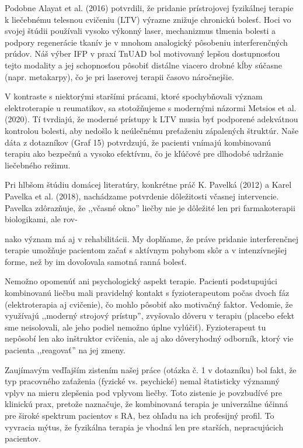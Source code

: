 Podobne Alayat et al. (2016) potvrdili, že pridanie prístrojovej fyzikálnej terapie k liečebnému telesnou cvičeniu (LTV) výrazne znižuje chronickú bolesť. Hoci vo svojej štúdii používali vysoko výkonný laser, mechanizmus tlmenia bolesti a podpory regenerácie tkanív je v mnohom analogický pôsobeniu interferenčných prúdov. Náš výber IFP v praxí TnUAD bol motivovaný lepšou dostupnosťou tejto modality a jej schopnosťou pôsobiť distálne viacero drobné kĺby súčasne (napr. metakarpy), čo je pri laserovej terapii časovo náročnejšie.

V kontraste s niektorými staršími prácami, ktoré spochybňovali výz​nam elektroterapie u reumatikov, sa stotožňujeme s modernými názormi Metsios et al. (2020). Tí tvrdia​jú, že moderné prístupy k LTV musia byť podporené adekvátnou kontrolou bolesti, aby nedošlo k neúlečnému preťaženiu zápalených štruktúr. Naše dáta z dotazníkov (Graf 15) potvrdzujú, že pacienti vnímajú kombinovanú terapiu ako bezpečnú a vysoko efektívnu, čo je kľúčové pre dlhodobé udržanie liečebného režim​u.

Pri hlbšom štúdiu domácej literatúry, konkrétne práč K. Pavelká (2012) a Karel Pavelka et al. (2018), nachádzame potvrdenie dôležitosti včasnej intervencie. Pavelka zdôrazňuje, že ,,včasné okno'' liečby nie je dôležité len pri farmakoterapii biologikami, ale rov-

nako výz​nam má aj v rehabilitácii. My doplňa​me, že práve pridanie interferenčnej terapie umožňuje pacientom začať s aktívnym pohybom skôr a v intenzívnejšej forme, než by im dovoľovala samotná ranná bolesť.

Nemožno opomenúť ani psychologický aspekt terapie. Pacienti podstup​ujúci kombinovanú liečbu mali pravidelný kontakt s fyzioterapeutom počas dvoch fáz (elektroterapia aj cvičenie), čo mohlo pôsobiť ako motivačný faktor. Vedomie, že využívajú ,,moderný strojový prístup'', zvyšovalo dôveru v terapiu (placebo efekt sme neisolovali, ale jeho podiel nemožno úplne vylúčiť). Fyzioterapeut tu nepôsobí len ako inštruktor cvičenia, ale aj ako dôveryhodný odborník, ktorý vie pacienta ,​,reagovať'' na jej zmeny.

Zaujímavým veďľajším zistením našej práce (otázka č. 1 v dotazníku) bol fakt, že typ pracovného zaťaženia (fyzické vs. psychické) nemal štatisticky význam​ný vplyv na mieru zlepšenia pod vplyvom liečby. Toto zistenie je povzbudívé pre klinickú prax, pretože nazna​čuje, že kombinovaná terapia je univerzálne účinná pre široké spektrum pacientov s RA, bez ohľadu na ich profesijný profil. To vyvracia mýtus, že fyzikálna terapia je vhodná len pre starších, nepracujúcich pacientov.

